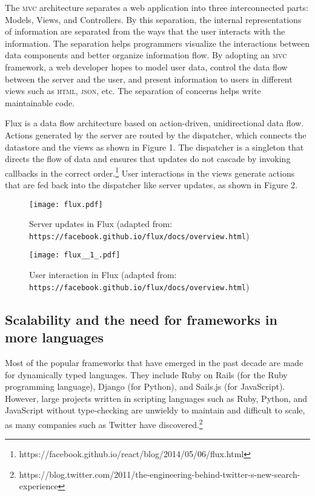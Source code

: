 \documentclass{article}
\begin{document}
The \textsc{mvc} architecture separates a web application into three interconnected parts: Models, Views, and Controllers. By this separation, the internal representations of information are separated from the ways that the user interacts with the information. The separation helps programmers visualize the interactions between data components and better organize information flow. By adopting an \textsc{mvc} framework, a web developer hopes to model user data, control the data flow between the server and the user, and present information to users in different views such as \textsc{html, json}, etc. The separation of concerns helps write maintainable code.

Flux is a data flow architecture based on action-driven, unidirectional data flow. Actions generated by the server are routed by the dispatcher, which connects the datastore and the views as shown in Figure 1. The dispatcher is a singleton that directs the flow of data and ensures that updates do not cascade by invoking callbacks in the correct order.\footnote{https://facebook.github.io/react/blog/2014/05/06/flux.html} User interactions in the views generate actions that are fed back into the dispatcher like server updates, as shown in Figure 2.

\begin{figure}[h]
\centering
\texttt{[image: flux.pdf]}
\caption{Server updates in Flux \newline{}(adapted from: \texttt{https://facebook.github.io/flux/docs/overview.html})}
\end{figure}

\begin{figure}[h]
\centering
\texttt{[image: flux\_\_1\_.pdf]}
\caption{User interaction in Flux \newline{}(adapted from: \texttt{https://facebook.github.io/flux/docs/overview.html})}
\end{figure}


\subsection{Scalability and the need for frameworks in more languages}
 
Most of the popular frameworks that have emerged in the past decade are made for dynamically typed languages. They include Ruby on Rails (for the Ruby programming language), Django (for Python), and Sails.js (for JavaScript). However, large projects written in scripting languages such as Ruby, Python, and JavaScript without type-checking are unwieldy to maintain and difficult to scale, as many companies such as Twitter have discovered.\footnote{{https://blog.twitter.com/2011/the-engineering-behind-twitter-s-new-search-experience}}
\end{document}

